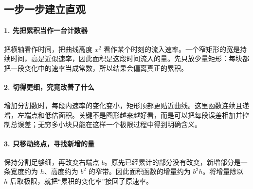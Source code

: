 \subsection*{一步一步建立直观}

\paragraph{1. 先把累积当作一台计数器}

把横轴看作时间，把曲线高度 $x^2$ 看作某个时刻的流入速率。一个窄矩形的宽是持续时间，高是近似速率，因此面积是这段时间流入的量。先只放少量矩形：每块都把一段变化中的速率当成常数，所以结果会偏离真正的累积。



\paragraph{2. 切得更细，究竟改善了什么}

增加分割数时，每段内速率的变化变小，矩形顶部更贴近曲线。这里函数连续且递增，左端点和低估面积。关键不是图形越来越好看，而是可以把每段误差相加并控制总误差；无穷多小块只能在这样一个极限过程中得到明确含义。



\paragraph{3. 只移动终点，寻找新增的量}

保持分割足够细，再改变右端点 $b$。原先已经累计的部分没有改变，新增部分是一条宽度约为 $h$、高度约为 $b^2$ 的窄带。因此面积函数的增量约为 $b^2h$。将增量除以 $h$ 后取极限，就把“累积的变化率”接回了原速率。
